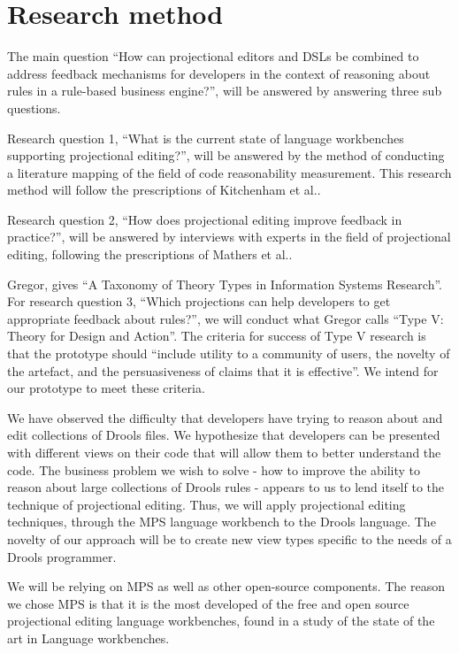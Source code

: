 \section{Research method} 

The main question ``How can projectional editors and DSLs be combined to address feedback mechanisms for developers in the context of reasoning about rules in a rule-based business engine?'', will be answered by answering three sub questions.

Research question 1, ``What is the current state of language workbenches supporting projectional editing?'', will be answered by the method of conducting a literature mapping of the field of code reasonability measurement. 
This research method will follow the prescriptions of Kitchenham et al.\cite{kitchenham2015evidence}.

Research question 2, ``How does projectional editing improve feedback in practice?'', will be answered by interviews with experts in the field of projectional editing, following the prescriptions of Mathers et al.\cite{mathers1998using}.

Gregor\cite{gregor2006nature}, gives ``A Taxonomy of Theory Types in Information Systems Research''. 
For research question 3, ``Which projections can help developers to get appropriate feedback about rules?'', we will conduct what Gregor calls ``Type V: Theory for Design and Action''. 
The criteria for success of Type V research is that the prototype should ``include utility to a community of users, the novelty of the artefact, and the persuasiveness of claims that it is effective''.
We intend for our prototype to meet these criteria.

We have observed the difficulty that developers have trying to reason about and edit collections of Drools files.
We hypothesize that developers can be presented with different views on their code that will allow them to better understand the code.
The business problem we wish to solve - how to improve the ability to reason about large collections of Drools rules - appears to us to lend itself to the technique of projectional editing.
Thus, we will apply projectional editing techniques, through the MPS language workbench to the Drools language.
The novelty of our approach will be to create new view types specific to the needs of a Drools programmer.

We will be relying on MPS as well as other open-source components.
The reason we chose MPS is that it is the most developed of the free and open source projectional editing language workbenches, found in a study of the state of the art in Language workbenches\cite{erdweg2013state}.

